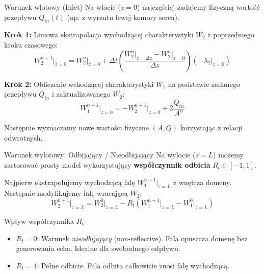 \documentclass[aspectratio=169]{beamer}
\begin{document}
\begin{frame}{Warunek wlotowy (Inlet)}
    Na wlocie ($z=0$) najczęściej zadajemy fizyczną wartość przepływu $Q_{in}(t)$ (np. z wyrzutu lewej komory serca).
    
    \vspace{0.2cm}
    \textbf{Krok 1:} Liniowa ekstrapolacja wychodzącej charakterystyki $W_2$ z poprzedniego kroku czasowego:
    $$W_2^{n+1}\big|_{z=0} = W_2^n\big|_{z=0} + \Delta t \left( \frac{W_2^n\big|_{z=\Delta z} - W_2^n\big|_{z=0}}{\Delta z} \right) (-\lambda_2\big|_{z=0})$$
    
    \textbf{Krok 2:} Obliczenie wchodzącej charakterystyki $W_1$ na podstawie zadanego przepływu $Q_{in}$ i zaktualizowanego $W_2$:
    $$W_1^{n+1}\big|_{z=0} = -W_2^{n+1}\big|_{z=0} + 2\frac{Q_{in}}{A^n}$$
    
    Następnie wyznaczamy nowe wartości fizyczne $(A, Q)$ korzystając z relacji odwrotnych.
\end{frame}

\begin{frame}{Warunek wylotowy: Odbijający / Nieodbijający}
    Na wylocie ($z=L$) możemy zastosować prosty model wykorzystujący \textbf{współczynnik odbicia} $R_t \in [-1, 1]$.
    
    \vspace{0.2cm}
    Najpierw ekstrapolujemy wychodzącą falę $W_1^{n+1}\big|_{z=L}$ z wnętrza domeny. Następnie modyfikujemy falę wracającą $W_2$:
    $$W_2^{n+1}\big|_{z=L} = W_2^0\big|_{z=L} - R_t \left( W_1^{n+1}\big|_{z=L} - W_1^0\big|_{z=L} \right)$$
    
    \begin{block}{Wpływ współczynnika $R_t$}
        \begin{itemize}
            \item \textbf{$R_t = 0$}: Warunek \textit{nieodbijający} (non-reflective). Fala opuszcza domenę bez generowania echa. Idealne dla swobodnego odpływu.
            \item \textbf{$R_t = 1$}: Pełne odbicie. Fala odbita całkowicie znosi falę wychodzącą.
        \end{itemize}
    \end{block}
\end{frame}
\end{document}

